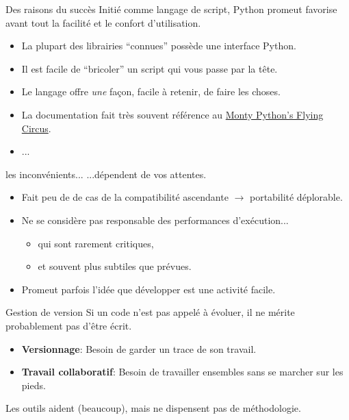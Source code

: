 \documentclass{beamer}
\begin{document}
\begin{frame}{Des raisons du succès}
  Initié comme langage de script, Python promeut favorise avant tout la facilité et le confort d'utilisation.
  \begin{itemize}
  \item La plupart des librairies ``connues'' possède une interface Python.
  \item Il est facile de ``bricoler'' un script qui vous passe par la tête.
  \item Le langage offre {\em une} façon, facile à retenir, de faire les choses.
  \item La documentation fait très souvent référence au \href{https://en.wikipedia.org/wiki/Monty_Python\%27s_Flying_Circus}{Monty Python's Flying Circus}.
  \item ...
  \end{itemize}
\end{frame}

\begin{frame}{les inconvénients...}
  ...dépendent de vos attentes.
  \begin{itemize}
  \item Fait peu de de cas de la compatibilité ascendante $\rightarrow$ portabilité déplorable.
  \item Ne se considère pas responsable des performances d'exécution...
    \begin{itemize}
    \item qui sont rarement critiques,
    \item et souvent plus subtiles que prévues. 
    \end{itemize}
  \item Promeut parfois l'idée que développer est une activité facile.
  \end{itemize}
\end{frame}

\begin{frame}{Gestion de version}
  Si un code n'est pas appelé à évoluer, il ne mérite probablement pas d'être écrit.
  \begin{itemize}
  \item {\bf Versionnage}: Besoin de garder un trace de son travail.
  \item {\bf Travail collaboratif}: Besoin de travailler ensembles sans se marcher sur les pieds.
  \end{itemize}
  Les outils aident (beaucoup), mais ne dispensent pas de méthodologie.
\end{frame}
\end{document}

